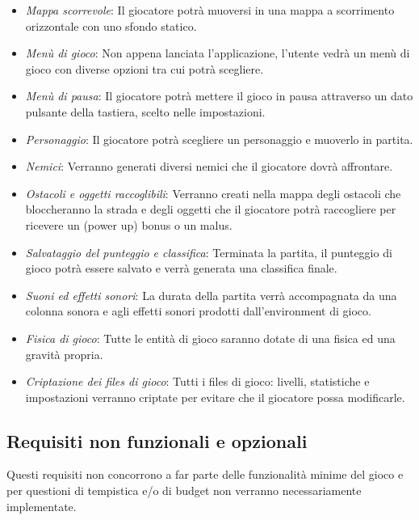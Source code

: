 \begin{itemize}
	\item \textsf{\small \emph{Mappa scorrevole}: Il giocatore potrà muoversi in una mappa a scorrimento orizzontale con uno sfondo statico.}
	\item \textsf{\small \emph{Menù di gioco}: Non appena lanciata l'applicazione, l'utente vedrà un menù di gioco con diverse opzioni tra cui potrà scegliere.}
	\item \textsf{\small \emph{Menù di pausa}: Il giocatore potrà mettere il gioco in pausa attraverso un dato pulsante della tastiera, scelto nelle impostazioni.}
	\item \textsf{\small \emph{Personaggio}: Il giocatore potrà scegliere un personaggio e muoverlo in partita.}
	\item \textsf{\small \emph{Nemici}: Verranno generati diversi nemici che il giocatore dovrà affrontare.}
	\item \textsf{\small \emph{Ostacoli e oggetti raccoglibili}: Verranno creati nella mappa degli ostacoli che bloccheranno la strada e degli oggetti che il giocatore potrà raccogliere per ricevere un (power up) bonus o un malus.}
	\item \textsf{\small \emph{Salvataggio del punteggio e classifica}: Terminata la partita, il punteggio di gioco potrà essere salvato e verrà generata una classifica finale.}
	\item \textsf{\small \emph{Suoni ed effetti sonori}: La durata della partita verrà accompagnata da una colonna sonora e agli effetti sonori prodotti dall'environment di gioco.}
	\item \textsf{\small \emph{Fisica di gioco}: Tutte le entità di gioco saranno dotate di una fisica ed una gravità propria.}
	\item \textsf{\small \emph{Criptazione dei files di gioco}: Tutti i files di gioco: livelli, statistiche e impostazioni verranno criptate per evitare che il giocatore possa modificarle.}
\end{itemize}

\subsection{Requisiti non funzionali e opzionali}

\textsf{\small Questi requisiti non concorrono a far parte delle funzionalità minime del gioco e per questioni di tempistica e/o di budget non verranno necessariamente implementate.}\\

